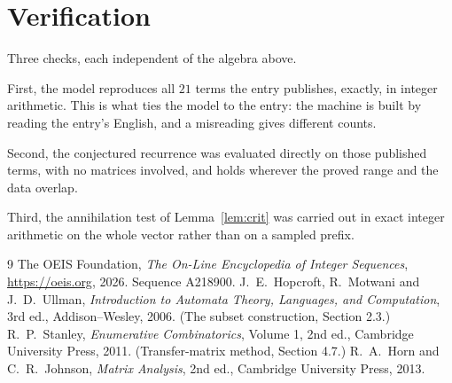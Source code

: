 \documentclass[11pt,a4paper]{article}
\theoremstyle{plain}
\theoremstyle{definition}
\begin{document}
\section{Verification}

Three checks, each independent of the algebra above.

First, the model reproduces all $21$ terms the entry publishes, exactly, in integer
arithmetic. This is what ties the model to the entry: the machine is built by reading the
entry's English, and a misreading gives different counts.

Second, the conjectured recurrence was evaluated directly on those published terms, with no
matrices involved, and holds wherever the proved range and the data overlap.

Third, the annihilation test of Lemma~\ref{lem:crit} was carried out in exact integer
arithmetic on the whole vector rather than on a sampled prefix.

\begin{thebibliography}{9}
 The OEIS Foundation, \emph{The On-Line Encyclopedia of Integer
Sequences}, \url{https://oeis.org}, 2026. Sequence A218900.
 J.~E.~Hopcroft, R.~Motwani and J.~D.~Ullman, \emph{Introduction to Automata
Theory, Languages, and Computation}, 3rd ed., Addison--Wesley, 2006. (The subset
construction, Section 2.3.)
 R.~P.~Stanley, \emph{Enumerative Combinatorics}, Volume 1, 2nd ed.,
Cambridge University Press, 2011. (Transfer-matrix method, Section 4.7.)
 R.~A.~Horn and C.~R.~Johnson, \emph{Matrix Analysis}, 2nd ed., Cambridge
University Press, 2013.
\end{thebibliography}
\end{document}
